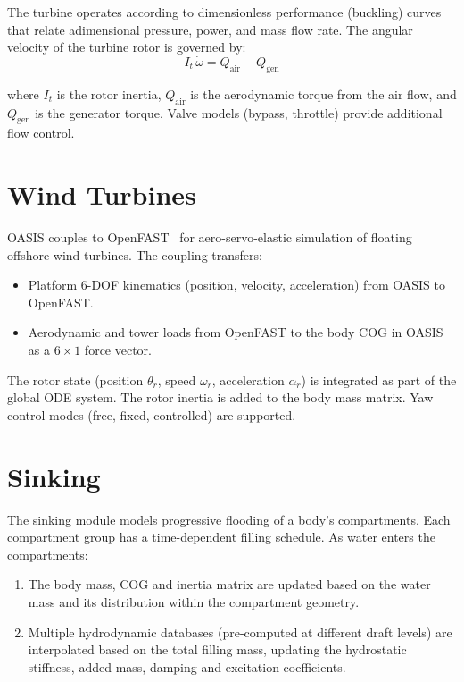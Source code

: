 \documentclass[11pt]{article}
\begin{document}
The turbine operates according to dimensionless performance (buckling) curves that relate adimensional pressure, power, and mass flow rate. The angular velocity of the turbine rotor is governed by:
\begin{equation}
I_t\,\dot{\omega} = Q_{\text{air}} - Q_{\text{gen}}
\end{equation}

where $I_t$ is the rotor inertia, $Q_{\text{air}}$ is the aerodynamic torque from the air flow, and $Q_{\text{gen}}$ is the generator torque. Valve models (bypass, throttle) provide additional flow control.


\section{Wind Turbines}
\label{sec:windturbines}

OASIS couples to OpenFAST~\cite{OpenFAST} for aero-servo-elastic simulation of floating offshore wind turbines. The coupling transfers:
\begin{itemize}
    \item Platform 6-DOF kinematics (position, velocity, acceleration) from OASIS to OpenFAST.
    \item Aerodynamic and tower loads from OpenFAST to the body COG in OASIS as a $6\times 1$ force vector.
\end{itemize}

The rotor state (position $\theta_r$, speed $\omega_r$, acceleration $\alpha_r$) is integrated as part of the global ODE system. The rotor inertia is added to the body mass matrix. Yaw control modes (free, fixed, controlled) are supported.


\section{Sinking}
\label{sec:sinking}

The sinking module models progressive flooding of a body's compartments. Each compartment group has a time-dependent filling schedule. As water enters the compartments:

\begin{enumerate}
    \item The body mass, COG and inertia matrix are updated based on the water mass and its distribution within the compartment geometry.
    \item Multiple hydrodynamic databases (pre-computed at different draft levels) are interpolated based on the total filling mass, updating the hydrostatic stiffness, added mass, damping and excitation coefficients.
\end{enumerate}
\end{document}
